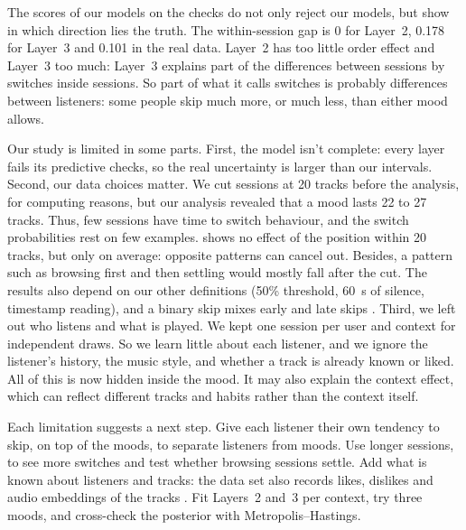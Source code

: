 \documentclass[12pt]{article}
\begin{document}
The scores of our models on the checks do not only reject our models, but show in which direction lies the truth. The within-session gap is 0 for Layer~2, 0.178 for Layer~3 and 0.101 in the real data. Layer~2 has too little order effect and Layer~3 too much: Layer~3 explains part of the differences between sessions by switches inside sessions. So part of what it calls switches is probably differences between listeners: some people skip much more, or much less, than either mood allows. 

Our study is limited in some parts. First, the model isn't complete: every layer fails its predictive checks, so the real uncertainty is larger than our intervals. Second, our data choices matter. We cut sessions at 20 tracks before the analysis, for computing reasons, but our analysis revealed that a mood lasts 22 to 27 tracks. Thus, few sessions have time to switch behaviour, and the switch probabilities rest on few examples.  shows no effect of the position within 20 tracks, but only on average: opposite patterns can cancel out. Besides,  a pattern such as browsing first and then settling would mostly fall after the cut. 
The results also depend on our other definitions (50\% threshold, 60~s of silence, timestamp reading), and a binary skip mixes early and late skips \citep{montecchio2020skipping}.
Third, we left out who listens and what is played. We kept one session per user and context for independent draws. So we learn little about each listener, and we ignore the listener's history, the music style, and whether a track is already known or liked. All of this is now hidden inside the mood. It may also explain the context effect, which can reflect different tracks and habits rather than the context itself.

Each limitation suggests a next step. Give each listener their own tendency to skip, on top of the moods, to separate listeners from moods. Use longer sessions, to see more switches and test whether browsing sessions settle. Add what is known about listeners and tracks: the data set also records likes, dislikes and audio embeddings of the tracks \citep{yandex2025card}. Fit Layers~2 and~3 per context, try three moods, and cross-check the posterior with Metropolis--Hastings.


\clearpage   %
\end{document}
